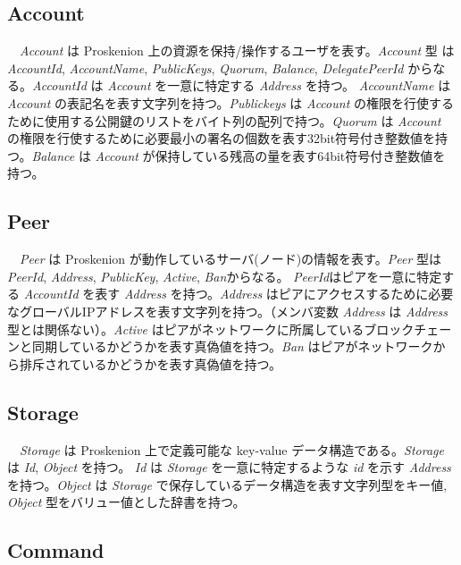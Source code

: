 \hypertarget{account}{%
\subsection{Account}\label{account}}

　\emph{Account} は Proskenion
上の資源を保持/操作するユーザを表す。\emph{Account} 型 は
\emph{AccountId}, \emph{AccountName}, \emph{PublicKeys}, \emph{Quorum},
\emph{Balance}, \emph{DelegatePeerId} からなる。\emph{AccountId} は
\emph{Account} を一意に特定する \emph{Address} を持つ。
\emph{AccountName} は \emph{Account}
の表記名を表す文字列を持つ。\emph{Publickeys} は \emph{Account}
の権限を行使するために使用する公開鍵のリストをバイト列の配列で持つ。\emph{Quorum}
は \emph{Account}
の権限を行使するために必要最小の署名の個数を表す32bit符号付き整数値を持つ。\emph{Balance}
は \emph{Account}
が保持している残高の量を表す64bit符号付き整数値を持つ。

\hypertarget{peer}{%
\subsection{Peer}\label{peer}}

　\emph{Peer} は Proskenion
が動作しているサーバ(ノード)の情報を表す。\emph{Peer} 型は
\emph{PeerId}, \emph{Address}, \emph{PublicKey}, \emph{Active},
\emph{Ban}からなる。 \emph{PeerId}はピアを一意に特定する
\emph{AccountId} を表す \emph{Address} を持つ。\emph{Address}
はピアにアクセスするために必要なグローバルIPアドレスを表す文字列を持つ。（メンバ変数
\emph{Address} は \emph{Address} 型とは関係ない）。\emph{Active}
はピアがネットワークに所属しているブロックチェーンと同期しているかどうかを表す真偽値を持つ。\emph{Ban}
はピアがネットワークから排斥されているかどうかを表す真偽値を持つ。

\hypertarget{storage}{%
\subsection{Storage}\label{storage}}

　\emph{Storage} は Proskenion 上で定義可能な key-value
データ構造である。\emph{Storage} は \emph{Id}, \emph{Object} を持つ。
\emph{Id} は \emph{Storage} を一意に特定するような \emph{id} を示す
\emph{Address} を持つ。\emph{Object} は \emph{Storage}
で保存しているデータ構造を表す文字列型をキー値, \emph{Object}
型をバリュー値とした辞書を持つ。

\hypertarget{command}{%
\subsection{Command}\label{command}}

